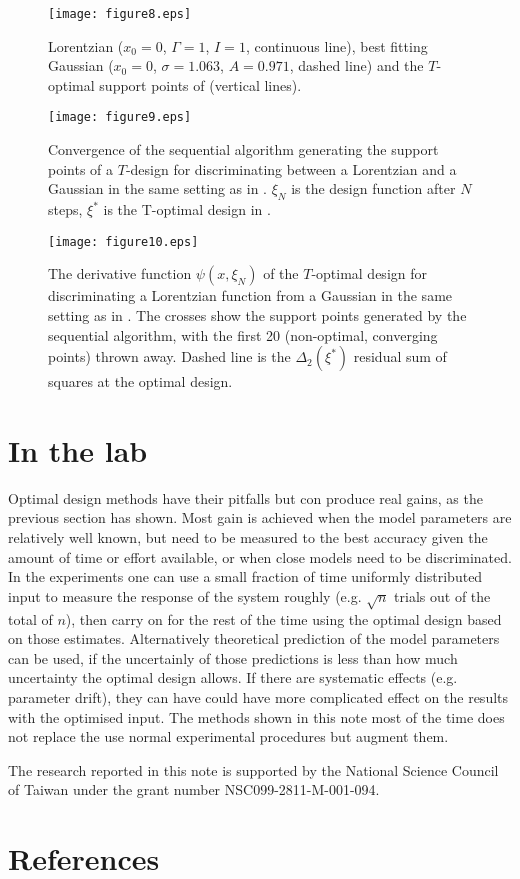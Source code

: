 \documentclass[12pt]{iopart}
\begin{document}
\begin{figure}
\texttt{[image: figure8.eps]}
\caption{Lorentzian ($x_0 = 0$, $\Gamma = 1$, $I = 1$, continuous line), best fitting Gaussian ($x_0 = 0$, $\sigma = 1.063$, $A = 0.971$, dashed line) and the $T$-optimal support points of  (vertical lines).}
\label{fig:lorgauss}
\end{figure}

\begin{figure}
\texttt{[image: figure9.eps]}
\caption{Convergence of the sequential algorithm generating the support points of a $T$-design for discriminating between a Lorentzian and a Gaussian in the same setting as in . $\xi_N$ is the design function after $N$ steps, $\xi^*$ is the T-optimal design in .}
\label{fig:toptconvergence}
\end{figure}

\begin{figure}
\texttt{[image: figure10.eps]}
\caption{The derivative function $\psi(x, \xi_N)$ of the $T$-optimal design for discriminating a Lorentzian function from a Gaussian in the same setting as in . The crosses show the support points generated by the sequential algorithm, with the first 20 (non-optimal, converging points) thrown away. Dashed line is the $\Delta_2(\xi^*)$ residual sum of squares at the optimal design.}
\label{fig:topt}
\end{figure}



\section{In the lab}

Optimal design methods have their pitfalls but con produce real gains, as the previous section has shown.  Most gain is achieved when the model parameters are relatively well known, but need to be measured to the best accuracy given the amount of time or effort available, or when close models need to be discriminated. In the experiments one can use a small fraction of time uniformly distributed input to measure the response of the system roughly (e.g. $\sqrt{n}$ trials out of the total of $n$), then carry on for the rest of the time using the optimal design based on those estimates. Alternatively theoretical prediction of the model parameters can be used, if the uncertainly of those predictions is less than how much uncertainty the optimal design allows. If there are systematic effects (e.g. parameter drift), they can have could have more complicated effect on the results with the optimised input. The methods shown in this note most of the time does not replace the use normal experimental procedures but augment them.

The research reported in this note is supported by the National Science Council of Taiwan under the grant number NSC099-2811-M-001-094.

\section*{References}


\end{document}

